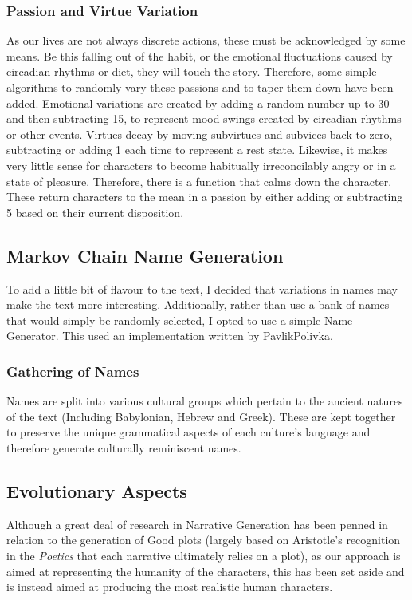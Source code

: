 \documentclass[12pt]{article}
\begin{document}
\subsubsection{Passion and Virtue Variation} 
As our lives are not always discrete actions, these must be acknowledged by some means. Be this falling out of the habit, or the emotional fluctuations caused by circadian rhythms or diet, they will touch the story. Therefore, some simple algorithms to randomly vary these passions and to taper them down have been added. Emotional variations are created by adding a random number up to 30 and then subtracting 15, to represent mood swings created by circadian rhythms or other events. Virtues decay by moving subvirtues and subvices back to zero, subtracting or adding 1 each time to represent a rest state. Likewise, it makes very little sense for characters to become habitually irreconcilably angry or in a state of pleasure. Therefore, there is a function that calms down the character. These return characters to the mean in a passion by either adding or subtracting 5 based on their current disposition. \\
\subsection{Markov Chain Name Generation}
To add a little bit of flavour to the text, I decided that variations in names may make the text more interesting. Additionally, rather than use a bank of names that would simply be randomly selected, I opted to use a simple Name Generator. This used an implementation written by PavlikPolivka.

\subsubsection{Gathering of Names}
Names are split into various cultural groups which pertain to the ancient natures of the text (Including Babylonian, Hebrew and Greek). These are kept together to preserve the unique grammatical aspects of each culture's language and therefore generate culturally reminiscent names. 

\subsection{Evolutionary Aspects}
Although a great deal of research in Narrative Generation has been penned in relation to the generation of Good plots (largely based on Aristotle's recognition in the \textit{Poetics} that each narrative ultimately relies on a plot), as our approach is aimed at representing the humanity of the characters, this has been set aside and is instead aimed at producing the most realistic human characters. 
\end{document}
